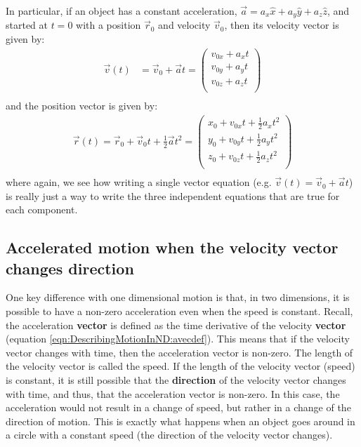 In particular, if an object has a constant acceleration, $\vec a=a_x\hat x+a_y\hat y+a_z\hat z$, and started at $t=0$ with a position $\vec r_0$ and velocity $\vec v_0$, then its velocity vector is given by:
\begin{align*}
\vec v(t)  &= \vec v_0+\vec at=\begin{pmatrix}
           v_{0x}+ a_xt \\
           v_{0y}+ a_yt \\
           v_{0z}+ a_zt \\
         \end{pmatrix}\\
\end{align*}
and the position vector is given by:
\begin{align*}
\vec r(t)= \vec r_0+\vec v_0 t+\frac{1}{2}\vec a t^2=\begin{pmatrix}
           x_0+v_{0x}t+\frac{1}{2} a_xt^2 \\
           y_0+v_{0y}t+\frac{1}{2} a_yt^2 \\
           z_0+v_{0z}t+\frac{1}{2} a_zt^2 \\
         \end{pmatrix}\\
\end{align*}
where again, we see how writing a single vector equation (e.g. $\vec v(t) = \vec v_0+\vec at$) is really just a way to write the three independent equations that are true for each component.

\subsection{Accelerated motion when the velocity vector changes direction}
\label{sec:DescribingMotionInND:accvconst}
One key difference with one dimensional motion is that, in two dimensions, it is possible to have a non-zero acceleration even when the speed is constant. Recall, the acceleration \textbf{vector} is defined as the time derivative of the velocity \textbf{vector} (equation \ref{eqn:DescribingMotionInND:avecdef}). This means that if the velocity vector changes with time, then the acceleration vector is non-zero. The length of the velocity vector is called the speed. If the length of the velocity vector (speed) is constant, it is still possible that the \textbf{direction} of the velocity vector changes with time, and thus, that the acceleration vector is non-zero. In this case, the acceleration would not result in a change of speed, but rather in a change of the direction of motion. This is exactly what happens when an object goes around in a circle with a constant speed (the direction of the velocity vector changes). 

